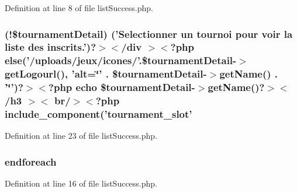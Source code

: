 Definition at line 8 of file list\-Success.\-php.

\hypertarget{live_2modules_2tournament_2templates_2list_success_8php_a66a4da4db315f7aff11e218f221c66fe}{
\subsubsection[{('\-Selectionner un tournoi pour voir la liste des inscrits.')?$>$$<$/div $>$$<$?php else}]{(!\$tournament\-Detail) ('Selectionner un tournoi pour voir la liste des inscrits.')?$>$$<$/div $>$$<$?php {\bf else}('/uploads/jeux/icones/'.\$tournament\-Detail-\/$>${\bf get\-Logourl}(), 'alt=\char`\"{}' . \$tournament\-Detail-\/$>$get\-Name() . '\char`\"{}')?$>$$<$?php echo \$tournament\-Detail-\/$>$get\-Name()?$>$$<$/h3 $>$$<$ br/$>$$<$?php {\bf include\-\_\-component}('tournament\-\_\-slot'}}\label{live_2modules_2tournament_2templates_2list_success_8php_a66a4da4db315f7aff11e218f221c66fe}


Definition at line 23 of file list\-Success.\-php.

\hypertarget{live_2modules_2tournament_2templates_2list_success_8php_a672d9707ef91db026c210f98cc601123}{
\subsubsection[{endforeach}]{\setlength{\rightskip}{0pt plus 5cm}endforeach}}\label{live_2modules_2tournament_2templates_2list_success_8php_a672d9707ef91db026c210f98cc601123}


Definition at line 16 of file list\-Success.\-php.

